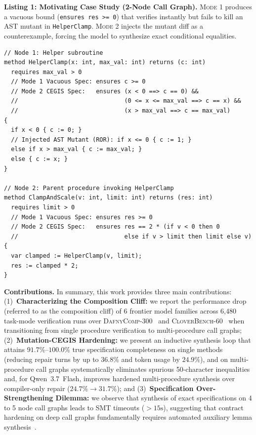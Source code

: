\documentclass{article}
\begin{document}
\vspace{0.5em}
\noindent\textbf{Listing 1: Motivating Case Study (2-Node Call Graph).} \textsc{Mode 1} produces a vacuous bound (\texttt{ensures res >= 0}) that verifies instantly but fails to kill an AST mutant in \texttt{HelperClamp}. \textsc{Mode 2} injects the mutant diff as a counterexample, forcing the model to synthesize exact conditional equalities.
{\footnotesize
\begin{verbatim}
// Node 1: Helper subroutine
method HelperClamp(x: int, max_val: int) returns (c: int)
  requires max_val > 0
  // Mode 1 Vacuous Spec: ensures c >= 0
  // Mode 2 CEGIS Spec:   ensures (x < 0 ==> c == 0) && 
  //                              (0 <= x <= max_val ==> c == x) && 
  //                              (x > max_val ==> c == max_val)
{
  if x < 0 { c := 0; }
  // Injected AST Mutant (ROR): if x <= 0 { c := 1; }
  else if x > max_val { c := max_val; }
  else { c := x; }
}

// Node 2: Parent procedure invoking HelperClamp
method ClampAndScale(v: int, limit: int) returns (res: int)
  requires limit > 0
  // Mode 1 Vacuous Spec: ensures res >= 0
  // Mode 2 CEGIS Spec:   ensures res == 2 * (if v < 0 then 0 
  //                              else if v > limit then limit else v)
{
  var clamped := HelperClamp(v, limit);
  res := clamped * 2;
}
\end{verbatim}
}
\vspace{0.5em}

\textbf{Contributions.} In summary, this work provides three main contributions: (1)~\textbf{Characterizing the Composition Cliff:} we report the performance drop (referred to as the composition cliff) of 6 frontier model families across 6,480 task-mode verification runs over \textsc{DafnyComp-300}~\citep{xu2025dafnycomp} and \textsc{CloverBench-60}~\citep{sun2024clover} when transitioning from single procedure verification to multi-procedure call graphs; (2)~\textbf{Mutation-CEGIS Hardening:} we present an inductive synthesis loop that attains $91.7\%\text{--}100.0\%$ true specification completeness on single methods (reducing repair turns by up to $36.8\%$ and token usage by $24.9\%$), and on multi-procedure call graphs systematically eliminates spurious 50-character inequalities and, for Qwen~3.7~Flash, improves hardened multi-procedure synthesis over compiler-only repair ($24.7\% \to 31.7\%$); and (3)~\textbf{Specification Over-Strengthening Dilemma:} we observe that synthesis of exact specifications on 4 to 5 node call graphs leads to SMT timeouts ($>15\text{s}$), suggesting that contract hardening on deep call graphs fundamentally requires automated auxiliary lemma synthesis~\citep{yang2025autoverus}.
\end{document}
